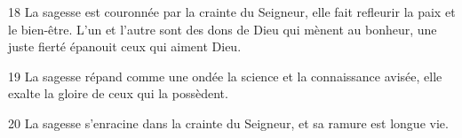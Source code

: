 18 La sagesse est couronnée par la crainte du Seigneur, elle fait refleurir la paix et le bien-être. L’un et l’autre sont des dons de Dieu qui mènent au bonheur, une juste fierté épanouit ceux qui aiment Dieu.

19 La sagesse répand comme une ondée la science et la connaissance avisée, elle exalte la gloire de ceux qui la possèdent.

20 La sagesse s’enracine dans la crainte du Seigneur, et sa ramure est longue vie.
